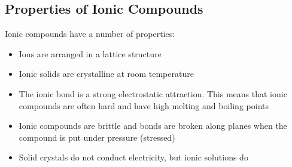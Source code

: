             \subsection*{Properties of Ionic Compounds}
            \nopagebreak \noindent
        \label{m38684*id142811}Ionic compounds have a number of properties:\par 
        \label{m38684*id142815}\begin{itemize}[noitemsep]
            \label{m38684*uid72}\item Ions are arranged in a lattice structure
\label{m38684*uid73}\item Ionic solids are crystalline at room temperature
\label{m38684*uid74}\item The ionic bond is a strong electrostatic attraction. This means that ionic compounds are often hard and have high melting and boiling points
\label{m38684*uid75}\item Ionic compounds are brittle and bonds are broken along planes when the compound is put under pressure (stressed)
\label{m38684*uid76}\item Solid crystals do not conduct electricity, but ionic solutions do
\end{itemize}
\label{m38684*secfhsst!!!underscore!!!id522}
